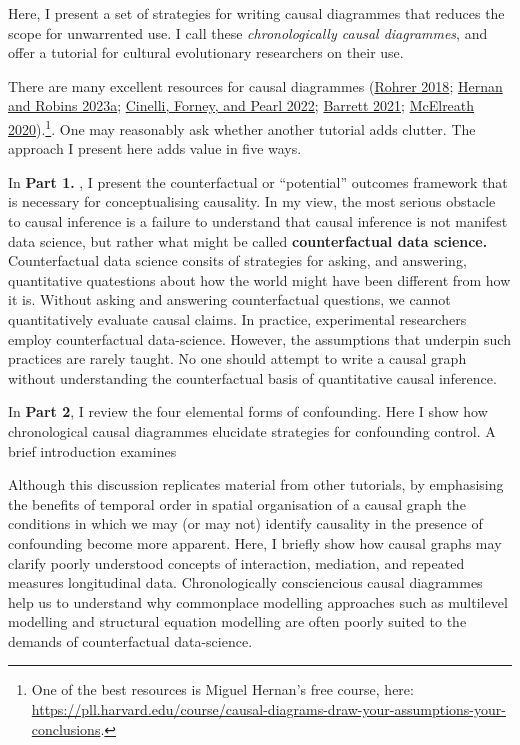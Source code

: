 \documentclass[
  singlecolumn]{report}
\begin{document}
Here, I present a set of strategies for writing causal diagrammes that
reduces the scope for unwarrented use. I call these
\emph{chronologically causal diagrammes}, and offer a tutorial for
cultural evolutionary researchers on their use.

There are many excellent resources for causal diagrammes
(\protect\hyperlink{ref-rohrer2018}{Rohrer 2018};
\protect\hyperlink{ref-hernan2023}{Hernan and Robins 2023a};
\protect\hyperlink{ref-cinelli2022}{Cinelli, Forney, and Pearl 2022};
\protect\hyperlink{ref-barrett2021}{Barrett 2021};
\protect\hyperlink{ref-mcelreath2020}{McElreath 2020}).\footnote{One of
  the best resources is Miguel Hernan's free course, here:
  \url{https://pll.harvard.edu/course/causal-diagrams-draw-your-assumptions-your-conclusions}.}.
One may reasonably ask whether another tutorial adds clutter. The
approach I present here adds value in five ways.

In \textbf{Part 1.} , I present the counterfactual or ``potential''
outcomes framework that is necessary for conceptualising causality. In
my view, the most serious obstacle to causal inference is a failure to
understand that causal inference is not manifest data science, but
rather what might be called \textbf{counterfactual data science.}
Counterfactual data science consits of strategies for asking, and
answering, quantitative quatestions about how the world might have been
different from how it is. Without asking and answering counterfactual
questions, we cannot quantitatively evaluate causal claims. In practice,
experimental researchers employ counterfactual data-science. However,
the assumptions that underpin such practices are rarely taught. No one
should attempt to write a causal graph without understanding the
counterfactual basis of quantitative causal inference.

In \textbf{Part 2}, I review the four elemental forms of confounding.
Here I show how chronological causal diagrammes elucidate strategies for
confounding control. A brief introduction examines

Although this discussion replicates material from other tutorials, by
emphasising the benefits of temporal order in spatial organisation of a
causal graph the conditions in which we may (or may not) identify
causality in the presence of confounding become more apparent. Here, I
briefly show how causal graphs may clarify poorly understood concepts of
interaction, mediation, and repeated measures longitudinal data.
Chronologically consciencious causal diagrammes help us to understand
why commonplace modelling approaches such as multilevel modelling and
structural equation modelling are often poorly suited to the demands of
counterfactual data-science.
\end{document}

